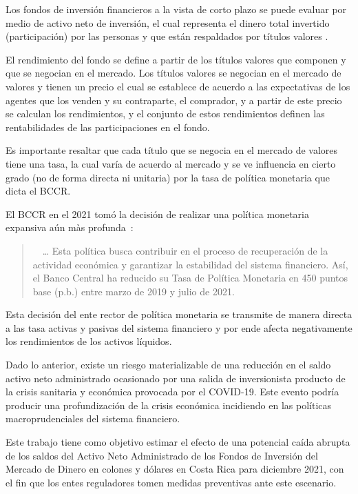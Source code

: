 \documentclass[
]{article}
\begin{document}
Los fondos de inversión financieros a la vista de corto plazo se puede evaluar por medio de activo neto de inversión, el cual representa el dinero total invertido (participación) por las personas y que están respaldados por títulos valores \autocite{bncr4} .

El rendimiento del fondo se define a partir de los títulos valores que componen y que se negocian en el mercado. Los títulos valores se negocian en el mercado de valores y tienen un precio el cual se establece de acuerdo a las expectativas de los agentes que los venden y su contraparte, el comprador, y a partir de este precio se calculan los rendimientos, y el conjunto de estos rendimientos definen las rentabilidades de las participaciones en el fondo.

Es importante resaltar que cada título que se negocia en el mercado de valores tiene una tasa, la cual varía de acuerdo al mercado y se ve influencia en cierto grado (no de forma directa ni unitaria) por la tasa de política monetaria que dicta el BCCR.

El BCCR en el 2021 tomó la decisión de realizar una política monetaria expansiva aún màs profunda~\autocite{bccr2}:

\begin{quote}
~~\ldots{} Esta política busca contribuir en el proceso de recuperación de la actividad económica y garantizar la estabilidad del sistema financiero. Así, el Banco Central ha reducido su Tasa de Política Monetaria en 450 puntos base (p.b.) entre marzo de 2019 y julio de 2021.~
\end{quote}

Esta decisión del ente rector de política monetaria se transmite de manera directa a las tasa activas y pasivas del sistema financiero y por ende afecta negativamente los rendimientos de los activos líquidos.~

Dado lo anterior, existe un riesgo materializable de una reducción en el saldo activo neto administrado ocasionado por una salida de inversionista producto de la crisis sanitaria y económica provocada por el COVID-19. Este evento podría producir una profundización de la crisis económica incidiendo en las políticas macroprudenciales del sistema financiero.

Este trabajo tiene como objetivo estimar el efecto de una potencial caída abrupta de los saldos del Activo Neto Administrado de los Fondos de Inversión del Mercado de Dinero en colones y dólares en Costa Rica para diciembre 2021, con el fin que los entes reguladores tomen medidas preventivas ante este escenario.
\end{document}
